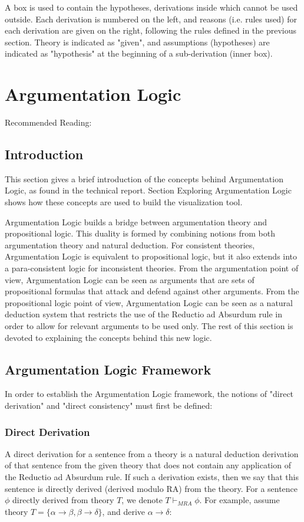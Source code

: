 \documentclass[11pt,twoside,a4paper]{report}
\begin{document}
A box is used to contain the hypotheses, derivations inside which cannot be used outside. Each derivation is numbered on the left, and reasons (i.e. rules used) for each derivation are given on the right, following the rules defined in the previous section. Theory is indicated as "given", and assumptions (hypotheses) are indicated as "hypothesis" at the beginning of a sub-derivation (inner box).

\section{Argumentation Logic}
Recommended Reading: \citep*{alpaper}

\subsection{Introduction}
This section gives a brief introduction of the concepts behind Argumentation Logic, as found in the technical report. Section Exploring Argumentation Logic shows how these concepts are used to build the visualization tool.

Argumentation Logic builds a bridge between argumentation theory and propositional logic. This duality is formed by combining notions from both argumentation theory and natural deduction. For consistent theories, Argumentation Logic is equivalent to propositional logic, but it also extends into a para-consistent logic for inconsistent theories. From the argumentation point of view, Argumentation Logic can be seen as arguments that are sets of propositional formulas that attack and defend against other arguments. From the propositional logic point of view, Argumentation Logic can be seen as a natural deduction system that restricts the use of the Reductio ad Absurdum rule in order to allow for relevant arguments to be used only. The rest of this section is devoted to explaining the concepts behind this new logic.

\subsection{Argumentation Logic Framework}
In order to establish the Argumentation Logic framework, the notions of "direct derivation" and "direct consistency" must first be defined:

\subsubsection{Direct Derivation}
A direct derivation for a sentence from a theory is a natural deduction derivation of that sentence from the given theory that does not contain any application of the Reductio ad Absurdum rule. If such a derivation exists, then we say that this sentence is directly derived (derived modulo RA) from the theory. For a sentence $\phi$ directly derived from theory $T$, we denote $T\vdash_{MRA} \phi$.
For example, assume theory $T = \{\alpha\rightarrow\beta, \beta\rightarrow\delta\}$, and derive $\alpha\rightarrow\delta$:
\end{document}
